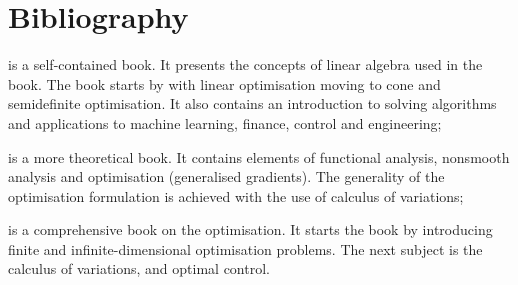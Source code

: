 \chapter{Bibliography}
\minitoc

\begin{description}
	\item \citep{CalafioreGhaoui2014} is a self-contained book. It presents the concepts of linear algebra used in the book. The book starts by with linear optimisation moving to cone and semidefinite optimisation. It also contains an introduction to solving algorithms and applications to machine learning, finance, control and engineering;
	
	\item \citep{Clarke:2013} is a more theoretical book. It contains elements of functional analysis, nonsmooth analysis and optimisation (generalised gradients). The generality of the optimisation formulation is achieved with the use of calculus of variations;
	
	\item \citep{Liberzon2012} is a comprehensive book on the optimisation. It starts the book by introducing finite and infinite-dimensional optimisation problems. The next subject is the calculus of variations, and optimal control.
\end{description}


\clearpage
\printbibliography[segment=\therefsegment,heading=subbibintoc]
